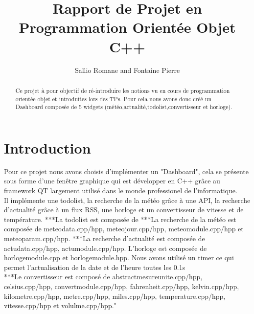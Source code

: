 \documentclass[12pt]{report}
\title{Rapport de Projet en Programmation Orientée Objet C++}
\author{Sallio Romane and Fontaine Pierre}
\begin{document}
  \maketitle
  \newpage
  \tableofcontents
  \begin{abstract}
    Ce projet à pour objectif de ré-introduire les notions vu en cours de programmation orientée objet et introduites lors des TPs. Pour cela nous avons donc créé un Dashboard composée de 5 widgets (météo,actualité,todolist,convertisseur et horloge).  
  \end{abstract}
  \newpage
  \part{Introduction}
    Pour ce projet nous avons choisis d'implémenter un "Dashboard", cela se présente sous forme d'une fenêtre graphique qui est développer en C++ grâce au framework QT largement utilisé dans le monde professionel de l'informatique.\\
    Il implémente une todolist, la recherche de la météo grâce à une API, la recherche d'actualité grâce à un flux RSS, une horloge et un convertisseur de vitesse et de température.
  \newline
    ***La todolist est composée de  
  \newline
    ***La recherche de la météo est composée de meteodata.cpp/hpp, meteojour.cpp/hpp, meteomodule.cpp/hpp et meteoparam.cpp/hpp.
  \newline
    ***La recherche d'actualité est composée de actudata.cpp/hpp, actumodule.cpp/hpp.
  \newline
    L'horloge est composée de horlogemodule.cpp et horlogemodule.hpp. Nous avons utilisé un timer ce qui permet l'actualisation de la date et de l'heure toutes les 0.1s\\
  \newline
    ***Le convertisseur est composé de abstractmesureunite.cpp/hpp, celsius.cpp/hpp, convertmodule.cpp/hpp, fahrenheit.cpp/hpp, kelvin.cpp/hpp, kilometre.cpp/hpp, metre.cpp/hpp, miles.cpp/hpp, temperature.cpp/hpp, vitesse.cpp/hpp et volulme.cpp/hpp."
    
\end{document}
